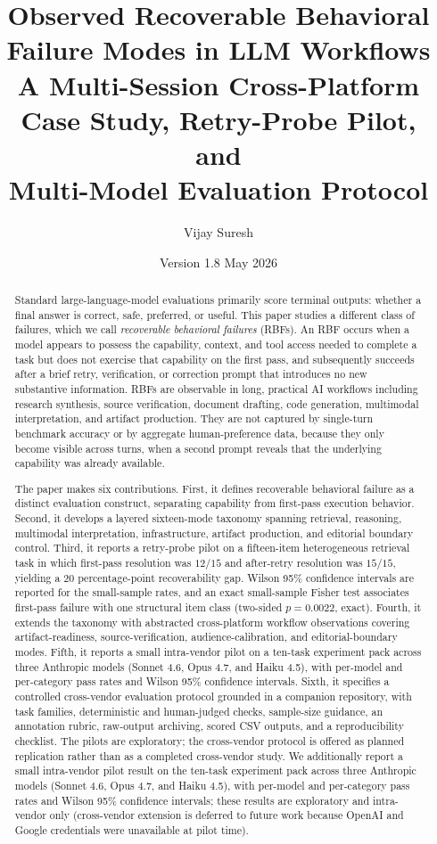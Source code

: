 \documentclass[11pt]{article}
\title{\textbf{Observed Recoverable Behavioral Failure Modes in LLM Workflows}\\
       \large A Multi-Session Cross-Platform Case Study, Retry-Probe Pilot, and\\
       Multi-Model Evaluation Protocol}
\author{Vijay Suresh}
\date{Version 1.8 \quad May 2026}
\begin{document}
\maketitle

\begin{abstract}
Standard large-language-model evaluations primarily score terminal outputs: whether a final answer is correct, safe, preferred, or useful. This paper studies a different class of failures, which we call \emph{recoverable behavioral failures} (RBFs). An RBF occurs when a model appears to possess the capability, context, and tool access needed to complete a task but does not exercise that capability on the first pass, and subsequently succeeds after a brief retry, verification, or correction prompt that introduces no new substantive information. RBFs are observable in long, practical AI workflows including research synthesis, source verification, document drafting, code generation, multimodal interpretation, and artifact production. They are not captured by single-turn benchmark accuracy or by aggregate human-preference data, because they only become visible across turns, when a second prompt reveals that the underlying capability was already available.

The paper makes six contributions. First, it defines recoverable behavioral failure as a distinct evaluation construct, separating capability from first-pass execution behavior. Second, it develops a layered sixteen-mode taxonomy spanning retrieval, reasoning, multimodal interpretation, infrastructure, artifact production, and editorial boundary control. Third, it reports a retry-probe pilot on a fifteen-item heterogeneous retrieval task in which first-pass resolution was $12/15$ and after-retry resolution was $15/15$, yielding a $20$ percentage-point recoverability gap. Wilson 95\% confidence intervals are reported for the small-sample rates, and an exact small-sample Fisher test associates first-pass failure with one structural item class (two-sided $p = 0.0022$, exact). Fourth, it extends the taxonomy with abstracted cross-platform workflow observations covering artifact-readiness, source-verification, audience-calibration, and editorial-boundary modes. Fifth, it reports a small intra-vendor pilot on a ten-task experiment pack across three Anthropic models (Sonnet 4.6, Opus 4.7, and Haiku 4.5), with per-model and per-category pass rates and Wilson 95\% confidence intervals. Sixth, it specifies a controlled cross-vendor evaluation protocol grounded in a companion repository, with task families, deterministic and human-judged checks, sample-size guidance, an annotation rubric, raw-output archiving, scored CSV outputs, and a reproducibility checklist. The pilots are exploratory; the cross-vendor protocol is offered as planned replication rather than as a completed cross-vendor study. We additionally report a small intra-vendor pilot result on the ten-task experiment pack across three Anthropic models (Sonnet 4.6, Opus 4.7, and Haiku 4.5), with per-model and per-category pass rates and Wilson 95\% confidence intervals; these results are exploratory and intra-vendor only (cross-vendor extension is deferred to future work because OpenAI and Google credentials were unavailable at pilot time).
\end{abstract}
\end{document}
